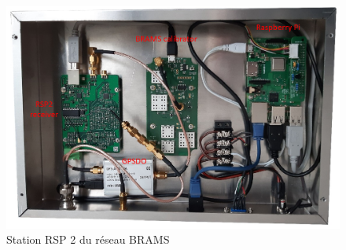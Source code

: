 \documentclass[11pt]{article}
\begin{document}
\begin{figure}[t]
    \begin{center}
        \includegraphics[scale=0.5]{RPS2.png}
        \caption{Station RSP 2 du réseau BRAMS}
    \end{center}
\end{figure}

\end{document}
